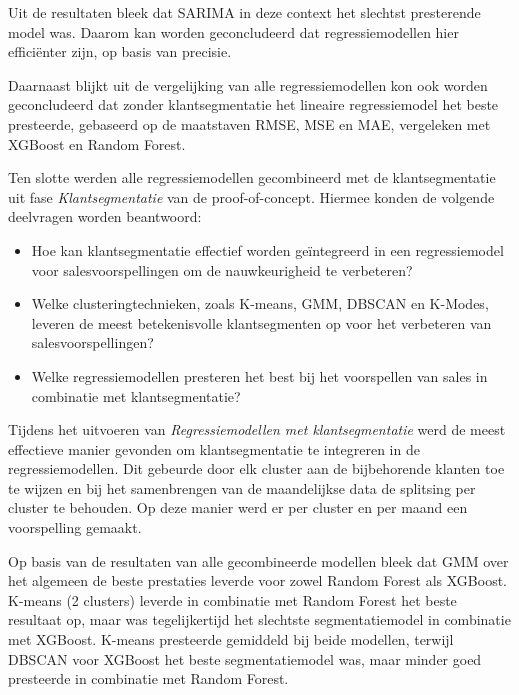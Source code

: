 Uit de resultaten bleek dat SARIMA in deze context het slechtst presterende model was. Daarom kan worden geconcludeerd dat regressiemodellen hier efficiënter zijn, op basis van precisie.

\vspace{1 em}

Daarnaast blijkt uit de vergelijking van alle regressiemodellen kon ook worden geconcludeerd dat zonder klantsegmentatie het lineaire regressiemodel het beste presteerde, gebaseerd op de maatstaven RMSE, MSE en MAE, vergeleken met XGBoost en Random Forest.

\vspace{1 em} 

Ten slotte werden alle regressiemodellen gecombineerd met de klantsegmentatie uit fase \textit{Klantsegmentatie} van de proof-of-concept. Hiermee konden de volgende deelvragen worden beantwoord:

\begin{itemize}
    \item Hoe kan klantsegmentatie effectief worden geïntegreerd in een regressiemodel voor salesvoorspellingen om de nauwkeurigheid te verbeteren?
    \item Welke clusteringtechnieken, zoals K-means, GMM, DBSCAN en K-Modes, leveren de meest betekenisvolle klantsegmenten op voor het verbeteren van salesvoorspellingen?
    \item Welke regressiemodellen presteren het best bij het voorspellen van sales in combinatie met klantsegmentatie?
\end{itemize}

Tijdens het uitvoeren van \textit{Regressiemodellen met klantsegmentatie} werd de meest effectieve manier gevonden om klantsegmentatie te integreren in de regressiemodellen. Dit gebeurde door elk cluster aan de bijbehorende klanten toe te wijzen en bij het samenbrengen van de maandelijkse data de splitsing per cluster te behouden. Op deze manier werd er per cluster en per maand een voorspelling gemaakt.

\vspace{1 em} 

Op basis van de resultaten van alle gecombineerde modellen bleek dat GMM over het algemeen de beste prestaties leverde voor zowel Random Forest als XGBoost. K-means (2 clusters) leverde in combinatie met Random Forest het beste resultaat op, maar was tegelijkertijd het slechtste segmentatiemodel in combinatie met XGBoost. K-means presteerde gemiddeld bij beide modellen, terwijl DBSCAN voor XGBoost het beste segmentatiemodel was, maar minder goed presteerde in combinatie met Random Forest.

